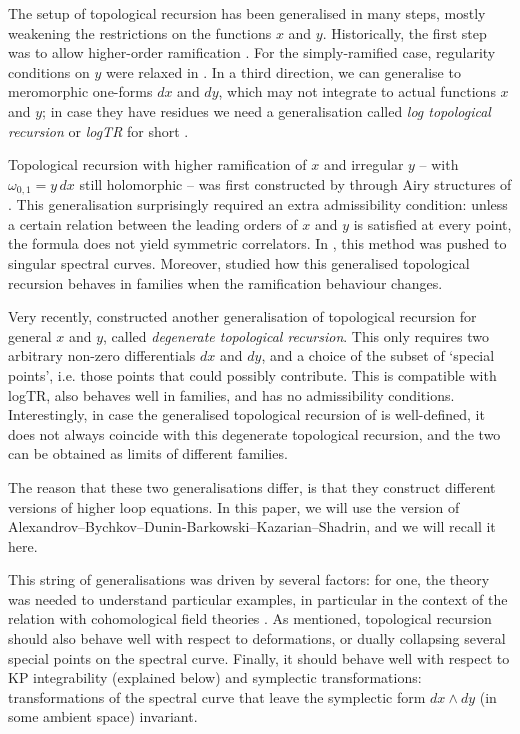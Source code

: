 \documentclass[10pt,a4paper,oneside,no-math,reqno]{amsart}%
\theoremstyle{plain}
\theoremstyle{definition}
\theoremstyle{remark}
\numberwithin{equation}{section}
\newcommand{\1}{\mathds{1}}
\newcommand{\<}{\langle}
\renewcommand{\>}{\rangle}
\begin{document}
The setup of topological recursion has been generalised in many steps, mostly weakening the restrictions on the functions $ x$ and $ y$. Historically, the first step was to allow higher-order ramification \cite{BE13}. For the simply-ramified case, regularity conditions on $y$ were relaxed in \cite{DN18,CN19}. In a third direction, we can generalise to meromorphic one-forms $ dx$ and $ dy$, which may not integrate to actual functions $ x$ and $y$; in case they have residues we need a generalisation called \emph{log topological recursion} or \emph{logTR} for short \cite{ABDKS24a}.

Topological recursion with higher ramification of $ x$ and irregular $y$ -- with $ \omega_{0,1} = y \, dx$ still holomorphic -- was first constructed by \cite{BBCCN24} through Airy structures of \cite{KS18}. This generalisation surprisingly required an extra admissibility condition: unless a certain relation between the leading orders of $ x$ and $ y$ is satisfied at every point, the formula does not yield symmetric correlators. In \cite{BKS24}, this method was pushed to singular spectral curves. Moreover, \cite{BBCKS25} studied how this generalised topological recursion behaves in families when the ramification behaviour changes. 

Very recently, \cite{ABDKS25} constructed another generalisation of topological recursion for general $x$ and $ y$, called \emph{degenerate topological recursion}. This only requires two arbitrary non-zero differentials $ dx$ and $ dy$, and a choice of the subset of `special points', i.e. those points that could possibly contribute. This is compatible with logTR, also behaves well in families, and has no admissibility conditions. Interestingly, in case the generalised topological recursion of \cite{BBCCN24} is well-defined, it does not always coincide with this degenerate topological recursion, and the two can be obtained as limits of different families.

The reason that these two generalisations differ, is that they construct different versions of higher loop equations. In this paper, we will use the version of Alexandrov--Bychkov--Dunin-Barkowski--Kazarian--Shadrin, and we will recall it here.
 
This string of generalisations was driven by several factors: for one, the theory was needed to understand particular examples, in particular in the context of the relation with cohomological field theories \cite{DOSS14,BCGS25}. As mentioned, topological recursion should also behave well with respect to deformations, or dually collapsing several special points on the spectral curve. Finally, it should behave well with respect to KP integrability (explained below) and symplectic transformations: transformations of the spectral curve that leave the symplectic form $ dx \wedge dy$ (in some ambient space) invariant.
\end{document}
